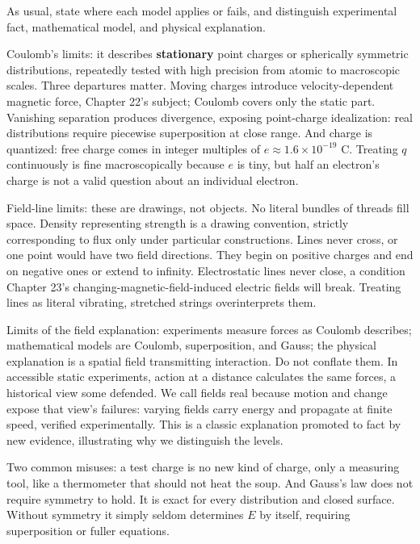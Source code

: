 \begin{mainline}
As usual, state where each model applies or fails, and distinguish experimental fact, mathematical model, and physical explanation.

Coulomb's limits: it describes \textbf{stationary} point charges or spherically symmetric distributions, repeatedly tested with high precision from atomic to macroscopic scales. Three departures matter. Moving charges introduce velocity-dependent magnetic force, Chapter 22's subject; Coulomb covers only the static part. Vanishing separation produces divergence, exposing point-charge idealization: real distributions require piecewise superposition at close range. And charge is quantized: free charge comes in integer multiples of \(e\approx1.6\times10^{-19}\) C. Treating \(q\) continuously is fine macroscopically because \(e\) is tiny, but half an electron's charge is not a valid question about an individual electron.

Field-line limits: these are drawings, not objects. No literal bundles of threads fill space. Density representing strength is a drawing convention, strictly corresponding to flux only under particular constructions. Lines never cross, or one point would have two field directions. They begin on positive charges and end on negative ones or extend to infinity. Electrostatic lines never close, a condition Chapter 23's changing-magnetic-field-induced electric fields will break. Treating lines as literal vibrating, stretched strings overinterprets them.

Limits of the field explanation: experiments measure forces as Coulomb describes; mathematical models are Coulomb, superposition, and Gauss; the physical explanation is a spatial field transmitting interaction. Do not conflate them. In accessible static experiments, action at a distance calculates the same forces, a historical view some defended. We call fields real because motion and change expose that view's failures: varying fields carry energy and propagate at finite speed, verified experimentally. This is a classic explanation promoted to fact by new evidence, illustrating why we distinguish the levels.

Two common misuses: a test charge is no new kind of charge, only a measuring tool, like a thermometer that should not heat the soup. And Gauss's law does not require symmetry to hold. It is exact for every distribution and closed surface. Without symmetry it simply seldom determines \(E\) by itself, requiring superposition or fuller equations.
\end{mainline}

